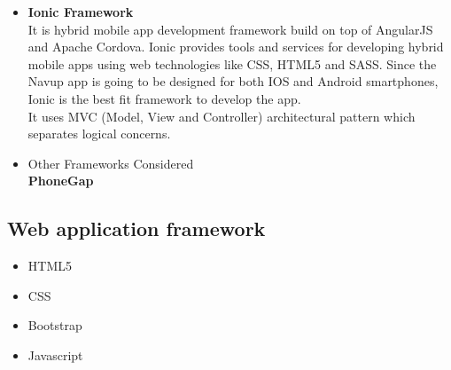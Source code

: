 \documentclass{article}
\begin{document}
	\begin{itemize}	
	
	\item \textbf{Ionic Framework}\\ It is hybrid mobile app development framework build on top of AngularJS and Apache Cordova. Ionic provides tools and services for developing hybrid mobile apps using web technologies like CSS, HTML5 and SASS. Since the Navup app is going to be designed for both IOS and Android smartphones, Ionic is the best fit framework to develop the app. \\
	It uses MVC (Model, View and Controller) architectural pattern which separates logical concerns.
	
	
	\item {Other Frameworks Considered}\\ 
	\textbf{PhoneGap}
	\end{itemize}
	\subsection{Web application framework}
	\begin{itemize}
	\item HTML5
	\item CSS
	\item Bootstrap
	\item Javascript
\end{itemize}
\end{document}
